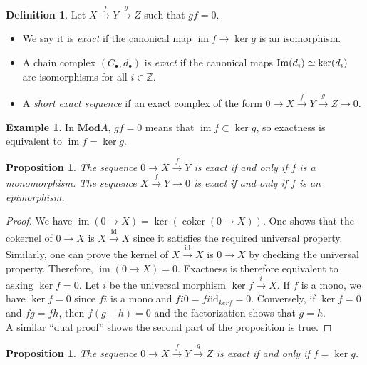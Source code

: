 \documentclass{article}
\newcommand{\id}{\mathrm{id}}
\newcommand{\Z}{\mathbb{Z}}
\newcommand{\Mod}{\mathbf{Mod}}
\DeclareMathOperator{\coker}{coker}
\DeclareMathOperator{\im}{im}
\renewcommand{\Im}{\mathop{\rm Im}}
\theoremstyle{plain}
\newtheorem{proposition}[theorem]{Proposition}
\theoremstyle{definition}
\newtheorem{definition}[theorem]{Definition}
\newtheorem{example}[theorem]{Example}
\theoremstyle{remark}
\begin{document}
\begin{definition}
    Let $X \xrightarrow{f} Y \xrightarrow{g} Z$ such that $gf = 0$.
    \begin{itemize}
        \item We say it is \emph{exact} if the canonical map $\im f \to \ker g$ is an isomorphism.
        \item A chain complex $(C_\bullet,d_\bullet)$ is \emph{exact} if the canonical maps $\Im(d_i) \simeq \ker(d_i)$ are isomorphisms for all $i \in \Z$. 
        \item A \emph{short exact sequence} if an exact complex of the form $0 \to X \xrightarrow{f} Y \xrightarrow{g} Z \to 0$.
    \end{itemize}
\end{definition}

\begin{example}
    In $\Mod A$, $gf = 0$ means that $\im f \subset \ker g$, so exactness is equivalent to $\im f = \ker g$.
\end{example}

\begin{proposition}
    The sequence $0 \to X \xrightarrow{f} Y$ is exact if and only if $f$ is a monomorphism. The sequence $X \xrightarrow{f} Y \to 0$ is exact if and only if $f$ is an epimorphism.
\end{proposition}

\begin{proof}
    We have $\im(0 \to X) = \ker(\coker(0 \to X))$. One shows that the cokernel of $0 \to X$ is $X \xrightarrow{\id} X$ since it satisfies the required universal property. Similarly, one can prove the kernel of $X \xrightarrow{\id} X$ is $0 \to X$ by checking the universal property. Therefore, $\im(0\to X) = 0$. Exactness is therefore equivalent to asking $\ker f = 0$. Let $i$ be the universal morphism $\ker f \xrightarrow{i} X$. If $f$ is a mono, we have $\ker f = 0$ since $fi$ is a mono and $fi0 = fi\id_{ker f} = 0$. Conversely, if $\ker f = 0$ and $fg = fh$, then $f(g-h) = 0$ and the factorization shows that $g = h$. \\
    A similar ``dual proof'' shows the second part of the proposition is true.
\end{proof}

\begin{proposition}
    The sequence $0 \to X \xrightarrow{f} Y \xrightarrow{g} Z$ is exact if and only if $f = \ker g$.
\end{proposition}
\end{document}
